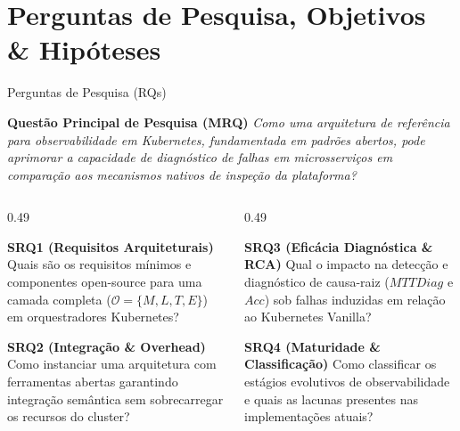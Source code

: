 \documentclass[aspectratio=169, 10pt]{beamer}
\begin{document}
\section{Perguntas de Pesquisa, Objetivos \& Hipóteses}

\begin{frame}{Perguntas de Pesquisa (RQs)}
  \begin{block}{\textbf{Questão Principal de Pesquisa (MRQ)}}
    \textit{Como uma arquitetura de referência para observabilidade em Kubernetes, fundamentada em padrões abertos, pode aprimorar a capacidade de diagnóstico de falhas em microsserviços em comparação aos mecanismos nativos de inspeção da plataforma?}
  \end{block}
  
  \vspace{1ex}
  \begin{columns}[T]
    \begin{column}{0.49\textwidth}
      \begin{exampleblock}{\textbf{SRQ1 (Requisitos Arquiteturais)}}
        \small Quais são os requisitos mínimos e componentes open-source para uma camada completa ($\mathcal{O} = \{M, L, T, E\}$) em orquestradores Kubernetes?
      \end{exampleblock}
      \vspace{0.5ex}
      \begin{exampleblock}{\textbf{SRQ2 (Integração \& Overhead)}}
        \small Como instanciar uma arquitetura com ferramentas abertas garantindo integração semântica sem sobrecarregar os recursos do cluster?
      \end{exampleblock}
    \end{column}
    
    \begin{column}{0.49\textwidth}
      \begin{exampleblock}{\textbf{SRQ3 (Eficácia Diagnóstica \& RCA)}}
        \small Qual o impacto na detecção e diagnóstico de causa-raiz ($MTTDiag$ e $Acc$) sob falhas induzidas em relação ao Kubernetes Vanilla?
      \end{exampleblock}
      \vspace{0.5ex}
      \begin{exampleblock}{\textbf{SRQ4 (Maturidade \& Classificação)}}
        \small Como classificar os estágios evolutivos de observabilidade e quais as lacunas presentes nas implementações atuais?
      \end{exampleblock}
    \end{column}
  \end{columns}
\end{frame}
\end{document}
